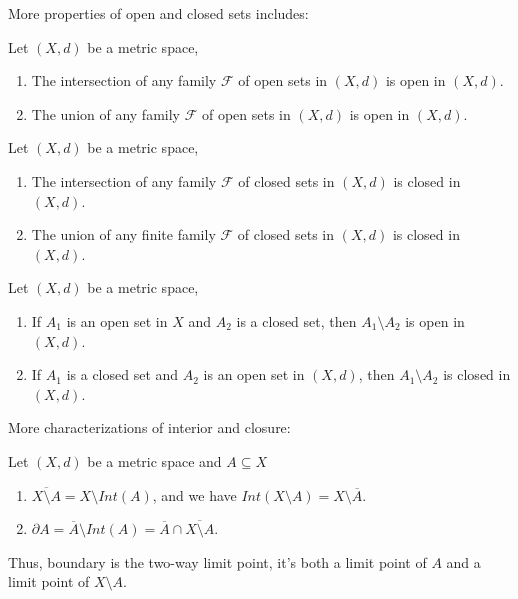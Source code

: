 \documentclass{tufte-handout}
\begin{document}
More properties of open and closed sets includes:
\begin{Proposition}
    Let \((X, d)\) be a metric space,
    \begin{enumerate}
        \item The intersection of any family \( \mathcal{F} \) of open sets in \( (X, d) \) is open in \( (X, d) \).
        \item The union of any family \( \mathcal{F} \) of open sets in \( (X, d) \) is open in \( (X, d) \).
    \end{enumerate}
\end{Proposition}

\begin{Proposition}
    Let \((X, d)\) be a metric space,
    \begin{enumerate}
        \item 
    The intersection of any family \( \mathcal{F} \) of closed sets in \( (X, d) \) is closed in \( (X, d) \).
    \item The union of any finite family \( \mathcal{F} \) of closed sets in \( (X, d) \) is closed in \( (X, d) \).
    \end{enumerate}
\end{Proposition}

\begin{Proposition}
    Let \((X, d)\) be a metric space,
    \begin{enumerate}
        \item If \( A_1 \) is an open set in \( X \) and \( A_2 \) is a closed set, then \( A_1\setminus A_2 \) is open in \( (X,d) \).
        \item If \(A_1\) is a closed set and \( A_2 \) is an open set in \( (X, d) \), then \( A_1\setminus A_2 \) is closed in \( (X, d) \).
    \end{enumerate}
\end{Proposition}

More characterizations of interior and closure:
\begin{Proposition}
    Let \( (X,d) \) be a metric space and \( A\subseteq X \)
    \begin{enumerate}
        \item \( \overline{X \setminus A} = X\setminus Int(A)\), and we have \(Int(X \setminus A) = X\setminus \overline{A}\).
        \item \( \partial A = \overline{A} \setminus Int(A) = \overline{A} \cap \overline{X\setminus A}\).
    \end{enumerate}
\end{Proposition}
Thus, boundary is the two-way limit point, it's both a limit point of \( A \) and a limit point of \( X \setminus A \).
\end{document}
